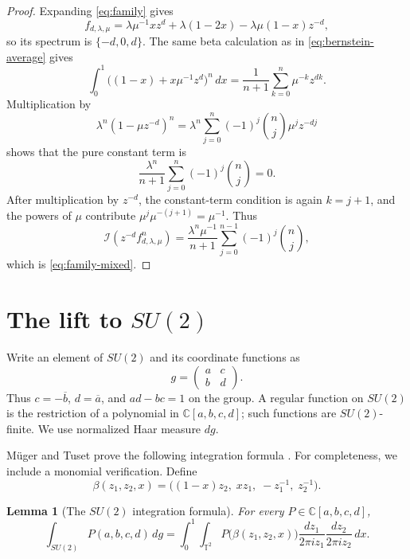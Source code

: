 \documentclass[11pt]{article}
\newcommand{\C}{\mathbb C}
\newcommand{\T}{\mathbb T}
\newcommand{\I}{\mathcal I}
\newtheorem{lemma}[theorem]{Lemma}
\theoremstyle{remark}
\begin{document}
\begin{proof}
Expanding \eqref{eq:family} gives
\[
  f_{d,\lambda,\mu}
  =\lambda\mu^{-1}xz^d
   +\lambda(1-2x)
   -\lambda\mu(1-x)z^{-d},
\]
so its spectrum is $\{-d,0,d\}$.  The same beta calculation as in
\eqref{eq:bernstein-average} gives
\[
  \int_0^1\bigl((1-x)+x\mu^{-1}z^d\bigr)^n\,dx
  =\frac1{n+1}\sum_{k=0}^n\mu^{-k}z^{dk}.
\]
Multiplication by
\[
  \lambda^n(1-\mu z^{-d})^n
  =\lambda^n\sum_{j=0}^n(-1)^j\binom nj\mu^jz^{-dj}
\]
shows that the pure constant term is
\[
  \frac{\lambda^n}{n+1}
  \sum_{j=0}^n(-1)^j\binom nj=0.
\]
After multiplication by $z^{-d}$, the constant-term condition is again $k=j+1$, and the powers of $\mu$ contribute
$\mu^j\mu^{-(j+1)}=\mu^{-1}$.  Thus
\[
  \I(z^{-d}f_{d,\lambda,\mu}^n)
  =\frac{\lambda^n\mu^{-1}}{n+1}
   \sum_{j=0}^{n-1}(-1)^j\binom nj,
\]
which is \eqref{eq:family-mixed}.
\end{proof}

\section{The lift to \texorpdfstring{$SU(2)$}{SU(2)}}

Write an element of $SU(2)$ and its coordinate functions as
\[
  g=\begin{pmatrix}a&c\\ b&d\end{pmatrix}.
\]
Thus $c=-\overline b$, $d=\overline a$, and $ad-bc=1$ on the group.
A regular function on $SU(2)$ is the restriction of a polynomial in
$\C[a,b,c,d]$; such functions are $SU(2)$-finite.  We use normalized Haar measure $dg$.

M\"uger and Tuset prove the following integration formula \cite[Lemma~2.1]{MugerTuset}.  For completeness, we include a monomial verification.  Define
\begin{equation}\label{eq:beta-map}
  \beta(z_1,z_2,x)
  =\bigl((1-x)z_2,\;xz_1,\;-z_1^{-1},\;z_2^{-1}\bigr).
\end{equation}

\begin{lemma}[The $SU(2)$ integration formula]\label{lem:su2-integration}
For every $P\in\C[a,b,c,d]$,
\begin{equation}\label{eq:su2-integration}
  \int_{SU(2)}P(a,b,c,d)\,dg
  =\int_0^1\int_{\T^2}
    P\bigl(\beta(z_1,z_2,x)\bigr)
    \frac{dz_1}{2\pi iz_1}\frac{dz_2}{2\pi iz_2}\,dx.
\end{equation}
\end{lemma}
\end{document}
